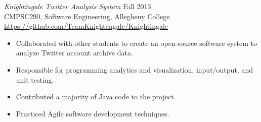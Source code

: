 \documentclass[margin]{res}
\begin{document}
\begin{resume}
                {\sl Knightingale Twitter Analysis System} \hfill Fall 2013 \\
                CMPSC290, Software Engineering, Allegheny College \\
                \url{https://github.com/TeamKnightengale/Knightingale}
                 \begin{itemize}  \itemsep -2pt %
                    \item Collaborated with other students to create an open-source software system to analyze Twitter account archive data.
                    \item Responsible for programming analytics and visualization, input/output, and unit testing.
                    \item Contributed a majority of Java code to the project.
                    \item Practiced Agile software development techniques.
                \end{itemize}


\end{resume} 
\end{document}
